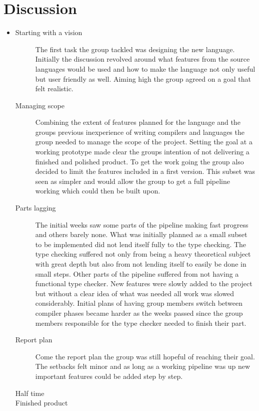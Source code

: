 \chapter{Discussion}


\begin{itemize}

  \item {}
  \begin{description}
    \item[Starting with a vision]
      The first task the group tackled was designing the new language. Initially the discussion revolved around what features from the source languages would be used and how to make the language not only useful but user friendly as well. Aiming high the group agreed on a goal that felt realistic. 
    \item[Managing scope]
      Combining the extent of features planned for the language and the groups previous inexperience of writing compilers and languages the group needed to manage the scope of the project. Setting the goal at a working prototype made clear the groups intention of not delivering a finished and polished product. To get the work going the group also decided to limit the features included in a first version. This subset was seen as simpler and would allow the group to get a full pipeline working which could then be built upon.
    \item[Parts lagging]
      The initial weeks saw some parts of the pipeline making fast progress and others barely none. What was initially planned as a small subset to be implemented did not lend itself fully to the type checking. The type checking suffered not only from being a heavy theoretical subject with great depth but also from not lending itself to easily be done in small steps. Other parts of the pipeline suffered from not having a functional type checker. New features were slowly added to the project but without a clear idea of what was needed all work was slowed considerably. Initial plans of having group members switch between compiler phases became harder as the weeks passed since the group members responsible for the type checker needed to finish their part.
    \item[Report plan]
      Come the report plan the group was still hopeful of reaching their goal. The setbacks felt minor and as long as a working pipeline was up new important features could be added step by step.
    \item[Half time]
    \item[Finished product]
  \end{description}


\end{itemize}
